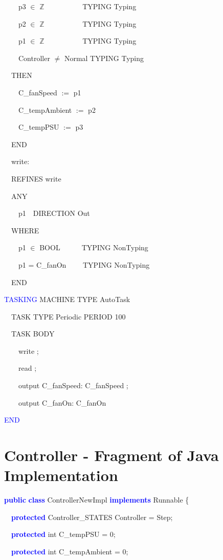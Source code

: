 \documentclass{llncs}%
\begin{document}
\ \ \ \ p3 ${\in}$ $\mathbb{Z}$ \ \ \ \ \ \ \ \ \ \  TYPING Typing

\ \ \ \ p2 ${\in}$ $\mathbb{Z}$ \ \ \ \ \ \ \ \ \ \  TYPING Typing

\ \ \ \ p1 ${\in}$ $\mathbb{Z}$ \ \ \ \ \ \ \ \ \ \  TYPING Typing

\ \ \ \ Controller ${\neq}$ Normal TYPING Typing 

\ \ THEN

\ \ \ \ C\_fanSpeed $:=$ p1 

\ \ \ \ C\_tempAmbient $:=$ p2 \ 

\ \ \ \ C\_tempPSU $:=$ p3 

\ \ END

\bigskip

\ \ write:\ \  \ 

\ \ REFINES write 

\ \ ANY

\ \ \ \ p1\ \  DIRECTION Out 

\ \ WHERE

\ \ \ \ p1 ${\in}$ BOOL\ \ \ \ \ \ TYPING NonTyping 

\ \ \ \ p1 = C\_fanOn \ \ \ \ TYPING NonTyping 

\ \ END

\bigskip

\textcolor{blue}{TASKING} MACHINE TYPE AutoTask \ 

\ \ TASK TYPE Periodic PERIOD 100 \ 

\ \ TASK BODY

\ \ \ \ write ;

\ \ \ \ read ;

\ \ \ \ output C\_fanSpeed: C\_fanSpeed ;

\ \ \ \ output C\_fanOn: C\_fanOn 

\textcolor{blue}{END}
%
%
%
\section{Controller - Fragment of Java Implementation}\label{ContJava}
{\ttfamily
\textbf{\textcolor{blue}{public}} \textbf{\textcolor{blue}{class}}
ControllerNewImpl \textbf{\textcolor{blue}{implements}} Runnable \{}

{\ttfamily
\ \ \textbf{\textcolor{blue}{protected}} Controller\_STATES Controller =
Step;}

{\ttfamily
\ \ \textbf{\textcolor{blue}{protected}} int C\_tempPSU = 0;}

{\ttfamily
\ \ \textbf{\textcolor{blue}{protected}} int C\_tempAmbient = 0;}
\end{document}
